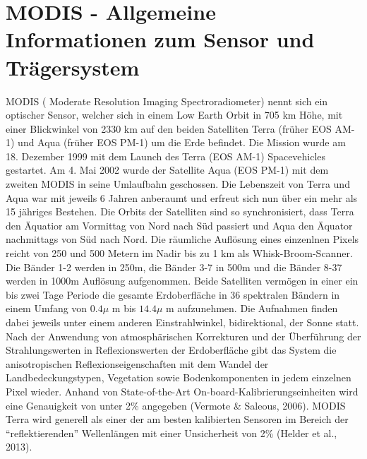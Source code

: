 \documentclass[11pt]{report}
\begin{document}

\section{MODIS - Allgemeine Informationen zum Sensor und Trägersystem}


MODIS ( Moderate Resolution Imaging Spectroradiometer) nennt sich ein optischer Sensor, welcher sich in einem Low Earth Orbit in 705 km Höhe, mit einer Blickwinkel von 2330 km auf den beiden Satelliten Terra (früher EOS AM-1) und Aqua (früher EOS PM-1) um die Erde befindet. Die Mission wurde am 18. Dezember 1999 mit dem Launch des Terra (EOS AM-1) Spacevehicles gestartet. Am 4. Mai 2002 wurde der Satellite Aqua (EOS PM-1) mit dem zweiten MODIS in seine Umlaufbahn geschossen. Die Lebenszeit von Terra und Aqua war mit jeweils 6 Jahren anberaumt und erfreut sich nun über ein mehr als 15 jähriges Bestehen. Die Orbits der Satelliten sind so synchronisiert, dass Terra den Äquatior am Vormittag von Nord nach Süd passiert und Aqua den Äquator nachmittags von Süd nach Nord. Die räumliche Auflösung eines einzenlnen Pixels reicht von 250 und 500 Metern im Nadir bis zu 1 km als Whisk-Broom-Scanner. Die Bänder 1-2 werden in 250m, die Bänder 3-7 in 500m und die Bänder 8-37 werden in 1000m Auflösung aufgenommen. Beide Satelliten vermögen in einer ein bis zwei Tage Periode die gesamte Erdoberfläche in 36 spektralen Bändern in einem Umfang von $0.4\mu$ m bis $14.4\mu$ m aufzunehmen. Die Aufnahmen finden dabei jeweils unter einem anderen Einstrahlwinkel, bidirektional,  der Sonne statt. Nach der Anwendung von atmosphärischen Korrekturen und der Überführung der Strahlungswerten in Reflexionswerten der Erdoberfläche gibt das System die anisotropischen Reflexionseigenschaften mit dem Wandel der Landbedeckungstypen, Vegetation sowie Bodenkomponenten  in jedem einzelnen Pixel wieder. Anhand von State-of-the-Art On-board-Kalibrierungseinheiten wird eine Genauigkeit von unter 2\% angegeben (Vermote \& Saleous, 2006). MODIS Terra wird generell als einer der am besten kalibierten Sensoren im Bereich der "`reflektierenden"' Wellenlängen mit einer Unsicherheit von 2\% (Helder et al., 2013).
\newline
\end{document}
